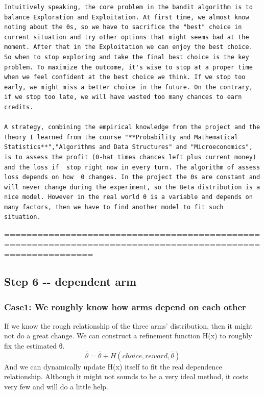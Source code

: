 \documentclass[11pt]{article}
\begin{document}
    \begin{verbatim}
Intuitively speaking, the core problem in the bandit algorithm is to balance Exploration and Exploitation. At first time, we almost know noting about the θs, so we have to sacrifice the "best" choice in current situation and try other options that might seems bad at the moment. After that in the Exploitation we can enjoy the best choice. So when to stop exploring and take the final best choice is the key problem. To maximize the outcome, it's wise to stop at a proper time when we feel confident at the best choice we think. If we stop too early, we might miss a better choice in the future. On the contrary, if we stop too late, we will have wasted too many chances to earn credits.

A strategy, combining the empirical knowledge from the project and the theory I learned from the course "**Probability and Mathematical Statistics**","Algorithms and Data Structures" and "Microeconomics", is to assess the profit (θ-hat times chances left plus current money) and the loss if  stop right now in every turn. The algorithm of assess loss depends on how  θ changes. In the project the θs are constant and will never change during the experiment, so the Beta distribution is a nice model. However in the real world θ is a variable and depends on many factors, then we have to find another model to fit such situation.
\end{verbatim}

    ============================================================================================================

    \subsection{Step 6 -\/- dependent arm}\label{step-6----dependent-arm}

    \subsubsection{Case1: We roughly know how arms depend on each
other}\label{case1-we-roughly-know-how-arms-depend-on-each-other}

    If we know the rough relationship of the three arms' distribution, then
it might not do a great change. We can construct a refinement function
H(x) to roughly fix the estimated θ. \[
\bar\theta=\bar\theta+H(choice,reward,\bar\theta)
\] And we can dynamically update H(x) itself to fit the real dependence
relationship. Although it might not sounds to be a very ideal method, it
costs very few and will do a little help.
\end{document}
